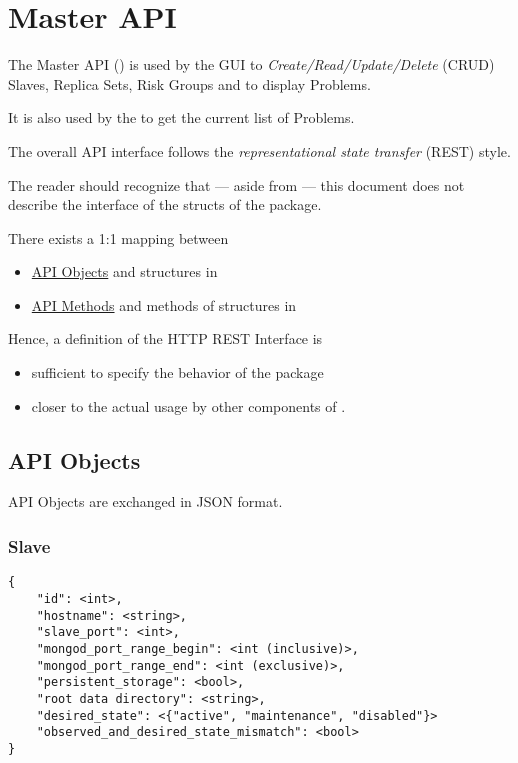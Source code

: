 \section{Master API}
The Master API () is used by the GUI to \emph{Create/Read/Update/Delete} (CRUD) Slaves, Replica Sets, Risk Groups and to display Problems.

It is also used by the  to get the current list of Problems.

The overall API interface follows the \emph{representational state transfer} (REST) style.

The reader should recognize that --- aside from  --- this document does not describe the interface
of the structs of the package.

There exists a 1:1 mapping between
\begin{itemize}
  \item \hyperref[masterapi:apiobjects]{API Objects} and structures in 
  \item \hyperref[masterapi:apimethods]{API Methods} and methods of structures in 
\end{itemize}

Hence, a definition of the HTTP REST Interface is
\begin{itemize}
  \item sufficient to specify the behavior of the  package
  \item closer to the actual usage by other components of \mamid.
\end{itemize}

\subsection{API Objects} \label{masterapi:apiobjects}
API Objects are exchanged in JSON format.
\subsubsection{Slave}
\begin{lstlisting}
{
	"id": <int>,
	"hostname": <string>,
	"slave_port": <int>,
	"mongod_port_range_begin": <int (inclusive)>,
	"mongod_port_range_end": <int (exclusive)>,
	"persistent_storage": <bool>,
	"root data directory": <string>,
	"desired_state": <{"active", "maintenance", "disabled"}>
	"observed_and_desired_state_mismatch": <bool>
}
\end{lstlisting}
